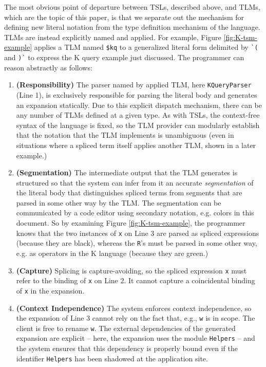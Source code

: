 \documentclass[acmsmall,review,anonymous]{acmart}\settopmatter{printfolios=true,printccs=false,printacmref=false}
\newcommand{\li}[1]{\lstinline[basicstyle=\ttfamily\fontsize{9pt}{1em}\selectfont]{#1}}
\begin{document}
The most obvious point of departure between TSLs, described above, and TLMs, which are the topic of this paper, is that we separate out the mechanism for defining new literal notation from the type definition mechanism of the language. TLMs are instead explicitly named and applied. For example, Figure \ref{fig:K-tsm-example} applies a TLM named \li{$kq} to a generalized literal form delimited by \li{`(} and \li{)`} to express the K query example just discussed. The programmer can reason abstractly as follows:
\begin{enumerate}[leftmargin=12pt]
\item[\CIRCLE] \textbf{(Responsibility)} The parser named by applied TLM, here \li{KQueryParser} (Line 1), is exclusively responsible for parsing the literal body and generates an expansion statically. Due to this explicit dispatch mechanism, there can be any number of TLMs defined at a given type. As with TSLs, the context-free syntax of the language is fixed, so the TLM provider can modularly establish that the notation that the TLM implements is unambiguous (even in situations where a spliced term itself applies another TLM, shown in a later example.)
\item[\CIRCLE] \textbf{(Segmentation)} The intermediate output that the TLM generates is structured so that the system can infer from it an accurate \emph{segmentation} of the literal body that distinguishes spliced terms from segments that are parsed in some other way by the TLM. The segmentation can be communicated by a code editor using secondary notation, e.g. colors in this document. So by examining Figure \ref{fig:K-tsm-example}, the programmer knows that the two instances of \li{x} on Line 3 are parsed as spliced expressions (because they are black), whereas the \li{R}'s must be parsed in some other way, e.g. as operators in the K language (because they are  green.)
\item[\CIRCLE] \textbf{(Capture)} Splicing is capture-avoiding, so the spliced expression \li{x} must refer to the binding of \li{x} on Line 2. It cannot capture a coincidental binding of \li{x} in the expansion.
\item[\CIRCLE] \textbf{(Context Independence)} The system enforces context independence, so the expansion of Line 3 cannot  rely on the fact that, e.g., \li{w} is in scope. The client is free to rename \li{w}. The external dependencies of the generated expansion are explicit -- here, the expansion uses the module \li{Helpers} -- and the system ensures that this dependency is properly bound even if the identifier \li{Helpers} has been shadowed at the application site.

\end{enumerate}
\end{document}

